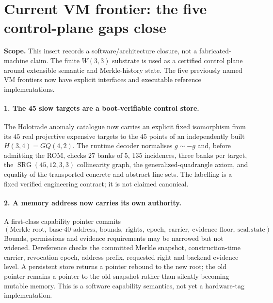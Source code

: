 \section*{Current VM frontier: the five control-plane gaps close}

\noindent\textbf{Scope.}
This insert records a software/architecture closure, not a fabricated-machine claim.
The finite $W(3,3)$ substrate is used as a certified control plane around extensible
semantic and Merkle-history state.  The five previously named VM frontiers now have
explicit interfaces and executable reference implementations.

\paragraph{1. The 45 slow targets are a boot-verifiable control store.}
The Holotrade anomaly catalogue now carries an explicit fixed isomorphism from its
$45$ real projective expensive targets to the $45$ points of an independently built
$H(3,4)=GQ(4,2)$.  The runtime decoder normalises $g\sim-g$ and, before admitting the
ROM, checks $27$ banks of $5$, $135$ incidences, three banks per target, the
$\operatorname{SRG}(45,12,3,3)$ collinearity graph, the generalized-quadrangle axiom,
and equality of the transported concrete and abstract line sets.  The labelling is a
fixed verified engineering contract; it is not claimed canonical.

\paragraph{2. A memory address now carries its own authority.}
A first-class capability pointer commits
\[
 (\text{Merkle root},\ \text{base-40 address},\ \text{bounds},\ \text{rights},\
   \text{epoch},\ \text{carrier},\ \text{evidence floor},\ \text{seal state}).
\]
Bounds, permissions and evidence requirements may be narrowed but not widened.
Dereference checks the committed Merkle snapshot, construction-time carrier,
revocation epoch, address prefix, requested right and backend evidence level.  A
persistent store returns a pointer rebound to the new root; the old pointer remains a
pointer to the old snapshot rather than silently becoming mutable memory.  This is a
software capability semantics, not yet a hardware-tag implementation.

